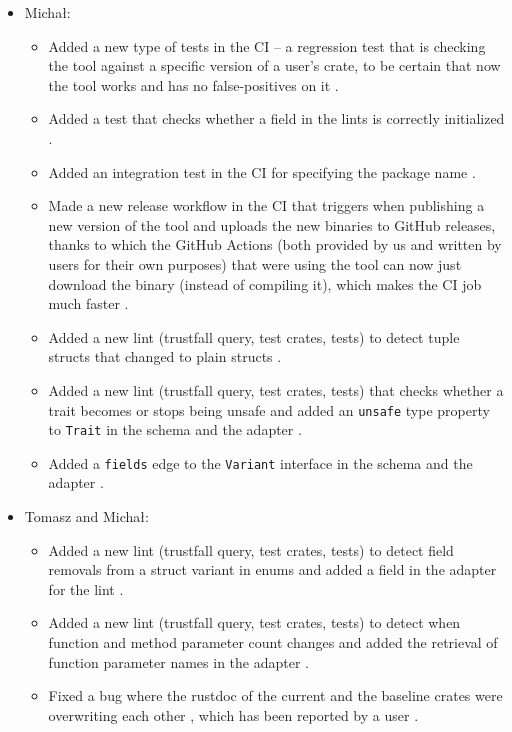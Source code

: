 \documentclass[licencjacka,en]{pracamgr}
\begin{document}
\begin{itemize}
	\item Michał:
		\begin{itemize}
			\item Added a new type of tests in the CI -- a regression test
				that is checking the tool against a specific version of a user's crate,
				to be certain that now the tool works and has
				no false-positives on it \cite{pr_add_running_on_rust_libp2p}.
			\item Added a test that checks whether a field in the lints
				is correctly initialized \cite{pr_add_error_template_instantiation}.
			\item Added an integration test in the CI for specifying the package name \cite{pr_test_specifying_package_name}.
			\item Made a new release workflow in the CI that triggers when publishing
				a new version of the tool and uploads the new binaries to GitHub releases,
				thanks to which the GitHub Actions
				(both provided by us and written by users for their own purposes) that were using the tool
				can now just download the binary (instead of compiling it),
				which makes the CI job much faster \cite{pr_upload_binaries}.
			\item Added a new lint (trustfall query, test crates, tests)
				to detect tuple structs that changed to plain structs \cite{pr_lint_tuple_structs}.
			\item Added a new lint (trustfall query, test crates, tests) that checks whether a trait
				becomes or stops being unsafe \cite{pr_trait_unsafe} and added an \texttt{unsafe} type
				property to \texttt{Trait} in the schema and the adapter \cite{pr_unsafe_parameter_trait}.
			\item Added a \texttt{fields} edge to the \texttt{Variant} interface
				in the schema and the adapter \cite{pr_add_fields_variant_interface}.
		\end{itemize}

	\item Tomasz and Michał:
		\begin{itemize}
			\item Added a new lint (trustfall query, test crates, tests) to
				detect field removals from a struct variant in enums \cite{pr_new_lint_field_removals_struct_variant_enum}
				and added a field in the adapter for the lint \cite{pr_added_field_structvariant}.
			\item Added a new lint (trustfall query, test crates, tests) \cite{pr_add_function_parameters_semver_checks}
				to detect when function and method parameter count changes
				and added the retrieval of function parameter names in the adapter \cite{pr_add_function_parameters}.
			\item Fixed a bug where the rustdoc of the current and the baseline crates
				were overwriting each other \cite{pr_rustdoc_overwriting},
				which has been reported by a user \cite{issue_rustdoc_overwriting}.
		\end{itemize}


\end{itemize}
\end{document}
